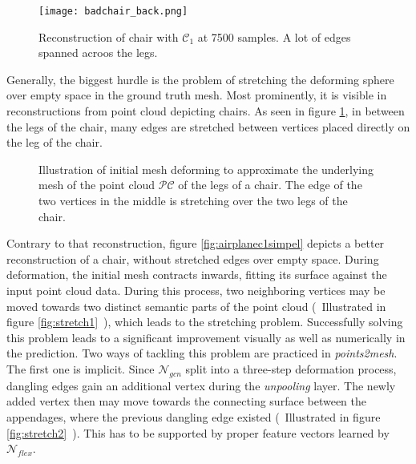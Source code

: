   \begin{figure}[htbp]
    \centering
    \texttt{[image: badchair\_back.png]}
    \caption{Reconstruction of chair with $\mathcal{C}_1$ at 7500 samples. A lot of edges spanned acroos the legs.} \label{fig:badchar}
  \end{figure}

  Generally, the biggest hurdle is the problem of stretching the deforming sphere over empty space in the ground truth mesh. Most prominently, 
  it is visible in reconstructions from point cloud depicting chairs. As seen in figure \ref{fig:badchar}, in between the legs of the chair, many 
  edges are stretched between vertices placed directly on the leg of the chair.

  \begin{figure}[htbp]
    \centering
    \caption{Illustration of initial mesh deforming to approximate the underlying mesh of the point cloud $\mathcal{PC}$ of the legs of a chair. The edge of the two vertices in the middle is stretching
    over the two legs of the chair.}\label{fig:stretching}
  \end{figure}
  Contrary to that reconstruction, figure \ref{fig:airplanec1simpel} depicts a better reconstruction of a chair, without stretched edges over empty space.
  During deformation, the initial mesh contracts inwards, fitting its surface against the input point cloud data. During this process, two neighboring 
  vertices may be moved towards two distinct semantic parts of the point cloud (~Illustrated in figure \ref{fig:stretch1}~), which leads to the stretching problem. 
  Successfully solving this problem leads to a significant improvement visually as well as numerically in the prediction.
  Two ways of tackling this problem are practiced in \emph{points2mesh}.
  The first one is implicit. Since $\mathcal{N}_{gcn}$ split into a three-step deformation process, dangling edges gain an additional vertex during
  the \emph{unpooling} layer. The newly added vertex then may move towards the connecting surface between the appendages, where the previous dangling
  edge existed (~Illustrated in figure \ref{fig:stretch2}~). This has to be supported by proper feature vectors learned by $\mathcal{N}_{flex}$.
